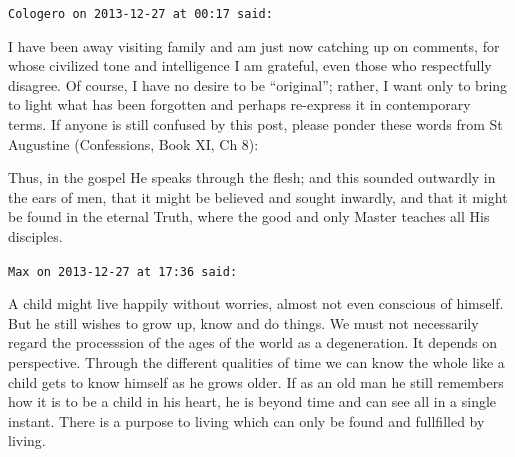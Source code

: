 \begin{footnotesize}
\begin{sffamily}
\hfill

\texttt{Cologero on 2013-12-27 at 00:17 said: }

I have been away visiting family and am just now catching up on comments, for whose civilized tone and intelligence I am
grateful, even those who respectfully disagree. Of course, I have no desire to be “original”; rather, I want only to
bring to light what has been forgotten and perhaps re-express it in contemporary terms. If anyone is still confused by
this post, please ponder these words from St Augustine (Confessions, Book XI, Ch 8):

\begin{quotex}\scriptsize
Thus, in the gospel He speaks through the flesh; and this sounded outwardly in the ears of men, that it might be
believed and sought inwardly, and that it might be found in the eternal Truth, where the good and only Master teaches
all His disciples. 

\end{quotex}

\hfill

\texttt{Max on 2013-12-27 at 17:36 said: }

A child might live happily without worries, almost not even conscious of himself. But he still wishes to grow up, know and do things. We must not necessarily regard the processsion of the ages of the world as a degeneration. It depends on perspective. Through the different qualities of time we can know the whole like a child gets to know himself as he grows older. If as an old man he still remembers how it is to be a child in his heart, he is beyond time and can see all in a single instant. There is a purpose to living which can only be found and fullfilled by living.

\hfill

\end{sffamily}\end{footnotesize}